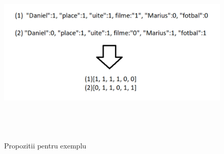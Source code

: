 		\begin{figure}[htbp]
			\centerline{\includegraphics[width=16cm, height=9cm]{figures/rezultat vectori.png}}
			\caption{Propozitii pentru exemplu}
			\label{fig}
		\end{figure}

